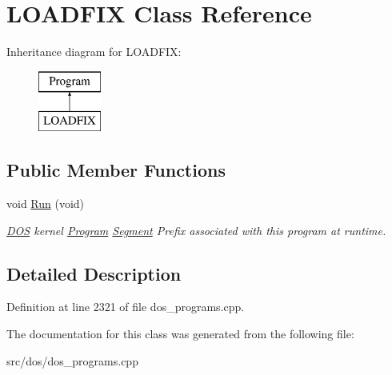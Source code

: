 \hypertarget{classLOADFIX}{\section{L\-O\-A\-D\-F\-I\-X Class Reference}
\label{classLOADFIX}
}
Inheritance diagram for L\-O\-A\-D\-F\-I\-X\-:\begin{figure}[H]
\begin{center}
\leavevmode
\includegraphics[height=2.000000cm]{classLOADFIX}
\end{center}
\end{figure}
\subsection*{Public Member Functions}
\begin{DoxyCompactItemize}
\item 
\hypertarget{classLOADFIX_a2edbc9814c14ed39a0410473df0bcc36}{void \hyperlink{classLOADFIX_a2edbc9814c14ed39a0410473df0bcc36}{Run} (void)}\label{classLOADFIX_a2edbc9814c14ed39a0410473df0bcc36}

\begin{DoxyCompactList}\small\item\em \hyperlink{classDOS}{D\-O\-S} kernel \hyperlink{classProgram}{Program} \hyperlink{structSegment}{Segment} Prefix associated with this program at runtime. \end{DoxyCompactList}\end{DoxyCompactItemize}


\subsection{Detailed Description}


Definition at line 2321 of file dos\-\_\-programs.\-cpp.



The documentation for this class was generated from the following file\-:\begin{DoxyCompactItemize}
\item 
src/dos/dos\-\_\-programs.\-cpp\end{DoxyCompactItemize}
